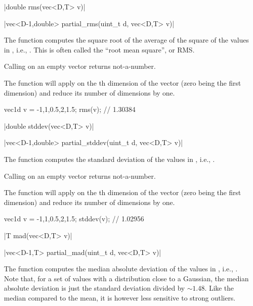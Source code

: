 \funcitem \cppinline|double rms(vec<D,T> v)| 

\cppinline|vec<D-1,double> partial_rms(uint_t d, vec<D,T> v)| 

The function  computes the square root of the average of the square of the values in , i.e., . This is often called the ``root mean square'', or RMS.

Calling  on an empty vector returns not-a-number.

The function  will apply  on the th dimension of the vector (zero being the first dimension) and reduce its number of dimensions by one.

\begin{example}
\begin{cppcode}
vec1d v = {-1,1,0.5,2,1.5};
rms(v); // 1.30384
\end{cppcode}
\end{example}

\funcitem \cppinline|double stddev(vec<D,T> v)| 

\cppinline|vec<D-1,double> partial_stddev(uint_t d, vec<D,T> v)| 

The function  computes the standard deviation of the values in , i.e., .

Calling  on an empty vector returns not-a-number.

The function  will apply  on the th dimension of the vector (zero being the first dimension) and reduce its number of dimensions by one.

\begin{example}
\begin{cppcode}
vec1d v = {-1,1,0.5,2,1.5};
stddev(v); // 1.02956
\end{cppcode}
\end{example}

\funcitem \cppinline|T mad(vec<D,T> v)| 

\cppinline|vec<D-1,T> partial_mad(uint_t d, vec<D,T> v)| 

The function  computes the median absolute deviation of the values in , i.e., . Note that, for a set of values with a distribution close to a Gaussian, the median absolute deviation is just the standard deviation divided by $\sim1.48$. Like the median compared to the mean, it is however less sensitive to strong outliers.

